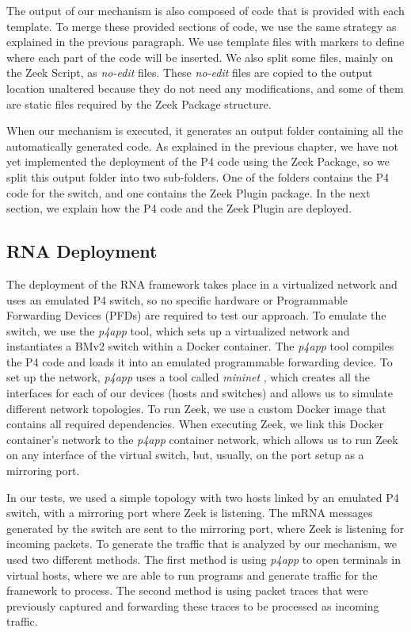 The output of our mechanism is also composed of code that is provided with each template. To merge these provided sections of code, we use the same strategy as explained in the previous paragraph. We use template files with markers to define where each part of the code will be inserted. We also split some files, mainly on the Zeek Script, as \textit{no-edit} files. These \textit{no-edit} files are copied to the output location unaltered because they do not need any modifications, and some of them are static files required by the Zeek Package structure.

When our mechanism is executed, it generates an output folder containing all the automatically generated code. As explained in the previous chapter, we have not yet implemented the deployment of the P4 code using the Zeek Package, so we split this output folder into two sub-folders. One of the folders contains the P4 code for the switch, and one contains the Zeek Plugin package. In the next section, we explain how the P4 code and the Zeek Plugin are deployed.

\subsection{RNA Deployment}
\label{sec:evaluation:deployment}

The deployment of the RNA framework takes place in a virtualized network and uses an emulated P4 switch, so no specific hardware or Programmable Forwarding Devices (PFDs) are required to test our approach. To emulate the switch, we use the \textit{p4app} tool, which sets up a virtualized network and instantiates a BMv2 switch \cite{BMv2} within a Docker container. The \textit{p4app} tool \cite{P4App} compiles the P4 code and loads it into an emulated programmable forwarding device. To set up the network, \textit{p4app} uses a tool called \textit{mininet} \cite{Mininet}, which creates all the interfaces for each of our devices (hosts and switches) and allows us to simulate different network topologies. To run Zeek, we use a custom Docker image that contains all required dependencies. When executing Zeek, we link this Docker container's network to the \textit{p4app} container network, which allows us to run Zeek on any interface of the virtual switch, but, usually, on the port setup as a mirroring port.

In our tests, we used a simple topology with two hosts linked by an emulated P4 switch, with a mirroring port where Zeek is listening. The mRNA messages generated by the switch are sent to the mirroring port, where Zeek is listening for incoming packets. To generate the traffic that is analyzed by our mechanism, we used two different methods. The first method is using \textit{p4app} to open terminals in virtual hosts, where we are able to run programs and generate traffic for the framework to process. The second method is using packet traces that were previously captured and forwarding these traces to be processed as incoming traffic.

